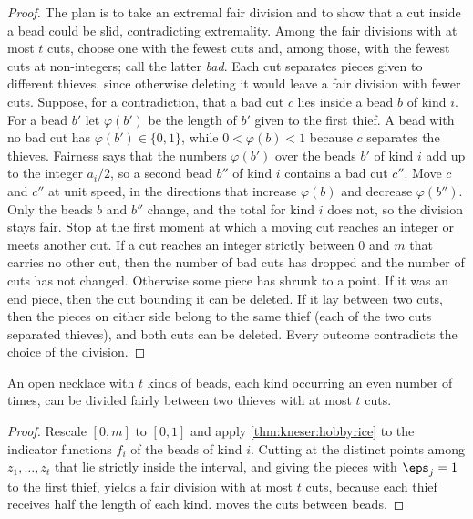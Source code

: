 \begin{refsection}
\begin{proof}
The plan is to take an extremal fair division and to show that a cut inside a bead could be slid, contradicting extremality. Among the fair divisions with at most $t$ cuts, choose one with the fewest cuts and, among those, with the fewest cuts at non-integers; call the latter \emph{bad}. Each cut separates pieces given to different thieves, since otherwise deleting it would leave a fair division with fewer cuts. Suppose, for a contradiction, that a bad cut $c$ lies inside a bead $b$ of kind $i$. For a bead $b'$ let $\varphi(b')$ be the length of $b'$ given to the first thief. A bead with no bad cut has $\varphi(b')\in\{0,1\}$, while $0<\varphi(b)<1$ because $c$ separates the thieves. Fairness says that the numbers $\varphi(b')$ over the beads $b'$ of kind $i$ add up to the integer $a_i/2$, so a second bead $b''$ of kind $i$ contains a bad cut $c''$. Move $c$ and $c''$ at unit speed, in the directions that increase $\varphi(b)$ and decrease $\varphi(b'')$. Only the beads $b$ and $b''$ change, and the total for kind $i$ does not, so the division stays fair. Stop at the first moment at which a moving cut reaches an integer or meets another cut. If a cut reaches an integer strictly between $0$ and $m$ that carries no other cut, then the number of bad cuts has dropped and the number of cuts has not changed. Otherwise some piece has shrunk to a point. If it was an end piece, then the cut bounding it can be deleted. If it lay between two cuts, then the pieces on either side belong to the same thief (each of the two cuts separated thieves), and both cuts can be deleted. Every outcome contradicts the choice of the division.
\end{proof}

\begin{theorem}\label{thm:kneser:necklace}
An open necklace with $t$ kinds of beads, each kind occurring an even number of times, can be divided fairly between two thieves with at most $t$ cuts.
\end{theorem}

\begin{proof}
Rescale $[0,m]$ to $[0,1]$ and apply \cref{thm:kneser:hobbyrice} to the indicator functions $f_i$ of the beads of kind $i$. Cutting at the distinct points among $z_1,\dots,z_t$ that lie strictly inside the interval, and giving the pieces with $\eps_j=1$ to the first thief, yields a fair division with at most $t$ cuts, because each thief receives half the length of each kind.  moves the cuts between beads.
\end{proof}


\end{refsection}
